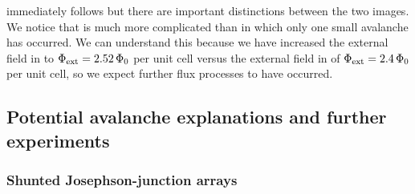  immediately follows
 but there are important
distinctions between the two images. We notice that 
 is much more complicated 
than  in which only one small
avalanche has occurred. We can understand this because we have 
increased the external field in 
to $\Phi_{\mathrm{ext}} = 2.52\,\Phi_0$ per unit cell versus the external field
in  of  
$\Phi_{\mathrm{ext}} = 2.4\,\Phi_0$ per unit cell, so we expect further flux
processes to have occurred. 

\subsection{Potential avalanche explanations and further experiments}

\subsubsection{Shunted Josephson-junction arrays}

